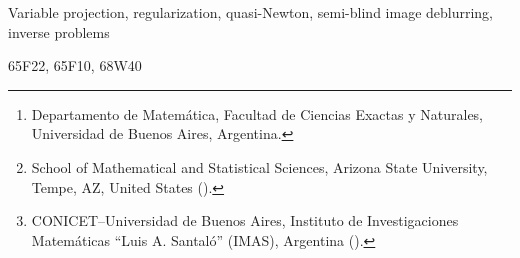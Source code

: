 \documentclass[onefignum,onetabnum]{siamart171218}
\title{{\TheTitle}}
\author{
Delfina B. Comerso Salzer\thanks{Departamento de Matem\'atica, Facultad de Ciencias Exactas y Naturales, Universidad de Buenos Aires, Argentina.}
\and
Malena I. Espa\~nol\thanks{School of Mathematical and Statistical Sciences, Arizona State University, Tempe, AZ, United States (\email{malena.espanol@asu.edu}).}
\and
Gabriela Jeronimo\thanks{CONICET–Universidad de Buenos Aires, Instituto de Investigaciones Matem\'aticas ``Luis A. Santal\'o'' (IMAS), Argentina (\email{jeronimo@dm.uba.ar}).}
}
\begin{document}
\maketitle


\begin{abstract} Separable nonlinear least squares problems appear in many inverse problems, including semi-blind image deblurring. The variable projection (VarPro) method provides an efficient approach for solving such problems by eliminating linear variables and reducing the problem to a smaller, nonlinear one. In this work, we extend VarPro to solve minimization problems containing a differentiable regularization term on the nonlinear parameters, along with a general-form Tikhonov regularization term on the linear variables. Furthermore, we develop a quasi-Newton method for solving the resulting reduced problem, and provide a local convergence analysis under standard smoothness assumptions, establishing conditions for superlinear or quadratic convergence. For large-scale settings, we introduce an inexact LSQR-based variant and prove its local convergence despite inner-solve and Hessian approximations. Numerical experiments on semi-blind deblurring show that parameter regularization prevents degenerate no-blur solutions and that the proposed methods achieve accurate reconstructions, with the inexact variant offering a favorable accuracy-cost tradeoff consistent with the %
theory. 

\end{abstract}

\begin{keywords} Variable projection, regularization, quasi-Newton, semi-blind image deblurring, inverse problems
\end{keywords}

\begin{AMS} 65F22, 65F10, 68W40
\end{AMS}
\end{document}
